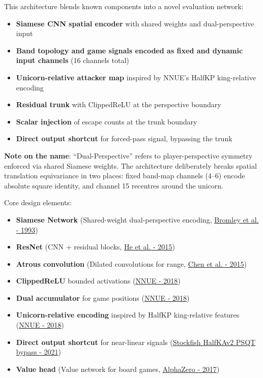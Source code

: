 \documentclass[11pt,a4paper]{article}
\begin{document}
This architecture blends known components into a novel evaluation network:
\begin{itemize}
  \item \textbf{Siamese CNN spatial encoder} with shared weights and dual-perspective input
  \item \textbf{Band topology and game signals encoded as fixed and dynamic input channels} (16 channels total)
  \item \textbf{Unicorn-relative attacker map} inspired by NNUE's HalfKP king-relative encoding
  \item \textbf{Residual trunk} with ClippedReLU at the perspective boundary
  \item \textbf{Scalar injection} of escape counts at the trunk boundary
  \item \textbf{Direct output shortcut} for forced-pass signal, bypassing the trunk
\end{itemize}

\noindent\textbf{Note on the name}: ``Dual-Perspective'' refers to player-perspective symmetry enforced via shared Siamese weights. The architecture deliberately breaks spatial translation equivariance in two places: fixed band-map channels (4--6) encode absolute square identity, and channel 15 recentres around the unicorn.

Core design elements:
\begin{itemize}
  \item \textbf{Siamese Network} (Shared-weight dual-perspective encoding, \href{https://papers.nips.cc/paper/1993/hash/0d4262ad58b4d3866d5aa0f4f9e1c06b-Abstract.html}{Bromley et al. - 1993})
  \item \textbf{ResNet} (CNN + residual blocks, \href{https://arxiv.org/abs/1512.03385}{He et al. - 2015})
  \item \textbf{Atrous convolution} (Dilated convolutions for range, \href{https://arxiv.org/abs/1511.07122}{Chen et al. - 2015})
  \item \textbf{ClippedReLU} bounded activations (\href{https://official-stockfish.github.io/docs/nnue-pytorch-wiki/docs/nnue.html}{NNUE - 2018})
  \item \textbf{Dual accumulator} for game positions (\href{https://official-stockfish.github.io/docs/nnue-pytorch-wiki/docs/nnue.html}{NNUE - 2018})
  \item \textbf{Unicorn-relative encoding} inspired by HalfKP king-relative features (\href{https://official-stockfish.github.io/docs/nnue-pytorch-wiki/docs/nnue.html}{NNUE - 2018})
  \item \textbf{Direct output shortcut} for near-linear signals (\href{https://github.com/official-stockfish/Stockfish/blob/master/src/nnue/nnue_architecture.h}{Stockfish HalfKAv2 PSQT bypass - 2021})
  \item \textbf{Value head} (Value network for board games, \href{https://arxiv.org/abs/1712.01815}{AlphaZero - 2017})
\end{itemize}
\end{document}
